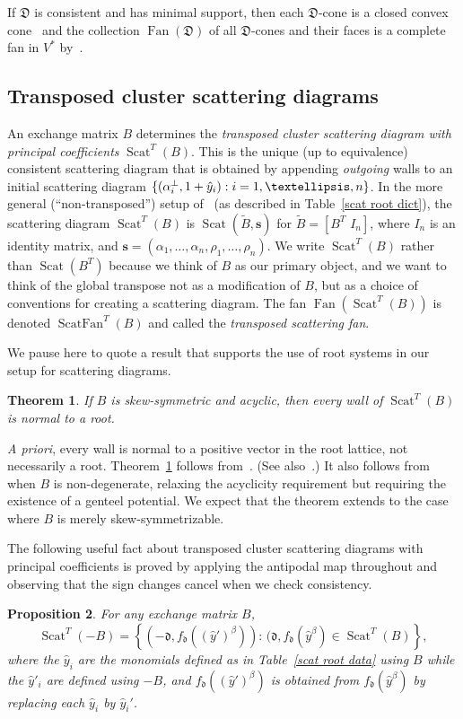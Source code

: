 \documentclass[10pt,a4paper]{amsart}
\newtheorem{theorem}{Theorem}[section]
\newtheorem{prop}[theorem]{Proposition}
\theoremstyle{definition}
\DeclareMathOperator{\Scat}{Scat}
\DeclareMathOperator{\Fan}{Fan}
\DeclareMathOperator{\ScatFan}{ScatFan}
\newcommand{\newword}[1]{\emph{#1}}
\newcommand{\set}[1]{{\left\lbrace #1 \right\rbrace}}
\newcommand{\D}{{\mathfrak D}}
\newcommand{\s}{\mathbf{s}}
\newcommand{\tB}{\tilde{B}}
\renewcommand{\d}{{\mathfrak d}}
\newcommand{\hy}{\hat{y}}
\begin{document}
If $\D$ is consistent and has minimal support, then each $\D$-cone is a closed convex cone~\cite[Proposition~3.5]{scatfan} and the collection $\Fan(\D)$ of all $\D$-cones and their faces is a complete fan in $V^*$ by~\cite[Theorem~3.1]{scatfan}.

\subsection{Transposed cluster scattering diagrams}\label{trans clus sec}
An exchange matrix $B$ determines the \newword{transposed cluster scattering diagram with principal coefficients} $\Scat^T (B)$.
This is the unique (up to equivalence) consistent scattering diagram that is obtained by appending \emph{outgoing} walls to an initial scattering diagram $%
\{(\alpha_i^\perp,1+ \hy_i): i\break =1,\ldots,n\}$.
In the more general (``non-transposed'') setup of~\cite{scatfan} (as described in Table~\ref{scat root dict}), the scattering diagram $\Scat^T(B)$ is $\Scat(\tB,\s)$ for $\tB=[B^T\,\,I_n]$, where $I_n$ is an identity matrix, and $\s=(\alpha_1,\ldots,\alpha_n,\rho_1,\ldots,\rho_n)$.
We write $\Scat^T(B)$ rather than $\Scat(B^T)$ because we think of $B$ as our primary object, and we want to think of the global transpose not as a modification of $B$, but as a choice of conventions for creating a scattering diagram.
The fan $\Fan(\Scat^T(B))$ is denoted $\ScatFan^T(B)$ and called the \newword{transposed scattering fan}.

We pause here to quote a result that supports the use of root systems in our setup for scattering diagrams.

\begin{theorem}\label{root thm}
If $B$ is skew-symmetric and acyclic, then every wall of $\Scat^T(B)$ is normal to a root.
\end{theorem}

\emph{A priori}, every wall is normal to a positive vector in the root lattice, not necessarily a root.
Theorem~\ref{root thm} follows from~\cite[Proposition~10.1]{GHKK}.
(See also~\cite[Example~10.4]{GHKK}.) 
It also follows from~\cite[Lemma~11.4]{Bridgeland} when $B$ is non-degenerate, relaxing the acyclicity requirement but requiring the existence of a genteel potential. 
We expect that the theorem extends to the case where $B$ is merely skew-symmetrizable.

The following useful fact about transposed cluster scattering diagrams with principal coefficients is proved by applying the antipodal map throughout and observing that the sign changes cancel when we check consistency.
\begin{prop}\label{scat antip}
For any exchange matrix $B$, 
\[\Scat^T(-B)=\set{(-\d,f_\d((\hy')^\beta)):\,(\d,f_\d(\hy^\beta)\in\Scat^T(B)},\]
where the $\hy_i$ are the monomials defined as in Table~\ref{scat root data} using $B$ while the $\hy'_i$ are defined using $-B$, and $f_\d((\hy')^\beta)$ is obtained from $f_\d(\hy^\beta)$ by replacing each $\hy_i$ by $\hy_i'$.
\end{prop}
\end{document}
